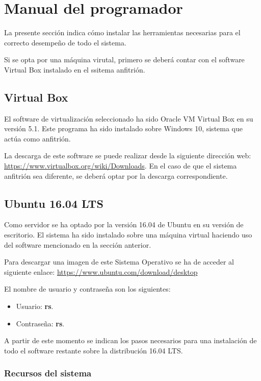 \section{Manual del programador}

La presente sección indica cómo instalar las herramientas necesarias para el correcto desempeño de todo el sistema.

Si se opta por una máquina virutal, primero se deberá contar con el software Virtual Box instalado en el ssitema anfitrión.

\subsection{Virtual Box}
El software de virtualización seleccionado ha sido Oracle VM Virtual Box en su versión 5.1. Este programa ha sido instalado sobre Windows 10, sistema que actúa como anfitrión.

La descarga de este software se puede realizar desde la siguiente dirección web: \url{https://www.virtualbox.org/wiki/Downloads}. En el caso de que el sistema anfitrión sea diferente, se deberá optar por la descarga correspondiente.

\subsection{Ubuntu 16.04 LTS}
Como servidor se ha optado por la versión 16.04 de Ubuntu en su versión de escritorio. El sistema ha sido instalado sobre una máquina virtual haciendo uso del software mencionado en la sección anterior.

Para descargar una imagen de este Sistema Operativo se ha de acceder al siguiente enlace: \url{https://www.ubuntu.com/download/desktop}

El nombre de usuario y contraseña son los siguientes:

\begin{itemize}
	\item Usuario: \textbf{rs}.
	\item Contraseña: \textbf{rs}.
\end{itemize}

A partir de este momento se indican los pasos necesarios para una instalación de todo el software restante sobre la distribución 16.04 LTS.

\subsubsection{Recursos del sistema}

